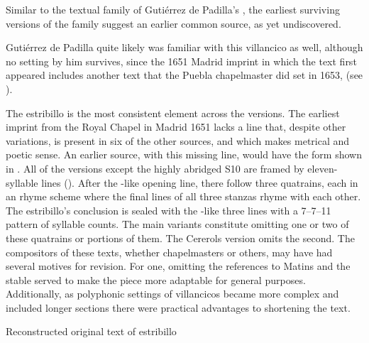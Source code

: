 Similar to the textual family of Gutiérrez de Padilla's , the
earliest surviving versions of the  family suggest an
earlier common source, as yet undiscovered.%
\begin{Footnote}
    Gutiérrez de Padilla quite likely was familiar with this villancico as
    well, although no setting by him survives, since the 1651 Madrid imprint
    in which the text first appeared includes another text that the Puebla
    chapelmaster did set in 1653,  (see
    ).
\end{Footnote}
The  estribillo is the most consistent element across
the versions.
The earliest imprint from the Royal Chapel in Madrid 1651 lacks a line that,
despite other variations, is present in six of the other sources, and which
makes metrical and poetic sense.
An earlier source, with this missing line, would have the form shown in
.
All of the versions except the highly abridged S10 are framed by eleven-syllable
lines ().
After the -like opening line, there follow three quatrains, each
in an  rhyme scheme where the final lines of all three stanzas rhyme
with each other.
The estribillo's conclusion is sealed with the -like three lines with
a 7--7--11 pattern of syllable counts.
The main variants constitute omitting one or two of these quatrains or portions
of them.
The Cererols version omits the second.
The compositors of these texts, whether chapelmasters or others, may have had
several motives for revision.
For one, omitting the references to Matins  and the stable
served to make the piece more adaptable for general purposes. 
Additionally, as polyphonic settings of villancicos became more complex and
included longer sections there were practical advantages to shortening the
text.


\begin{table}
    \caption{Reconstructed original text of 
    estribillo} 
    \label{tab:suspended-original}
\end{table}

